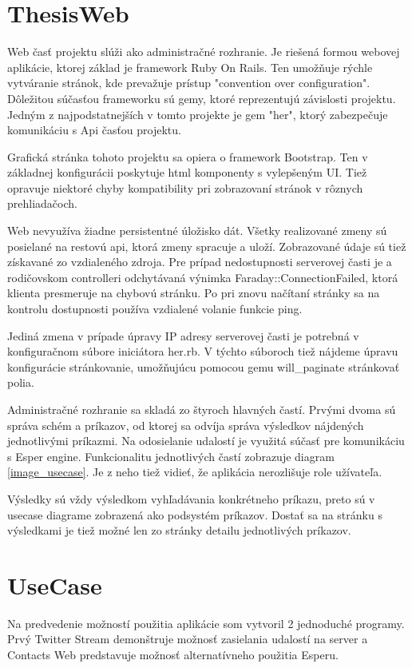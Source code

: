\section{ThesisWeb}
	Web časť projektu slúži ako administračné rozhranie. Je riešená formou webovej aplikácie, ktorej základ je framework Ruby On Rails. Ten umožňuje rýchle vytváranie stránok, kde prevažuje prístup "convention over configuration". Dôležitou súčasťou frameworku sú gemy, ktoré reprezentujú závislosti projektu. Jedným z najpodstatnejších v tomto projekte je gem "her", ktorý zabezpečuje komunikáciu s Api časťou projektu.
	
	
	Grafická stránka tohoto projektu sa opiera o framework Bootstrap. Ten v základnej konfigurácii poskytuje html komponenty s vylepšeným UI. Tiež opravuje niektoré chyby kompatibility pri zobrazovaní stránok v rôznych prehliadačoch.
	
	Web nevyužíva žiadne persistentné úložisko dát. Všetky realizované zmeny sú posielané na restovú api, ktorá zmeny spracuje a uloží. Zobrazované údaje sú tiež získavané zo vzdialeného zdroja.
	Pre prípad nedostupnosti serverovej časti je a rodičovskom controlleri odchytávaná výnimka Faraday::ConnectionFailed, ktorá klienta presmeruje na chybovú stránku. Po pri znovu načítaní stránky sa na kontrolu dostupnosti používa vzdialené volanie funkcie ping.
	
	Jediná zmena v prípade úpravy IP adresy serverovej časti je potrebná v konfiguračnom súbore iniciátora her.rb. V týchto súboroch tiež nájdeme úpravu konfigurácie stránkovanie, umožňujúcu pomocou gemu will\_paginate stránkovať polia.

	Administračné rozhranie sa skladá zo štyroch hlavných častí. Prvými dvoma sú správa schém a príkazov, od ktorej sa odvíja správa výsledkov nájdených jednotlivými príkazmi. Na odosielanie udalostí je využitá súčasť pre komunikáciu s Esper engine. Funkcionalitu jednotlivých častí zobrazuje diagram \ref{image_usecase}. Je z neho tiež vidieť, že aplikácia nerozlišuje role užívateľa.	
	
	Výsledky sú vždy výsledkom vyhľadávania konkrétneho príkazu, preto sú v usecase diagrame zobrazená ako podsystém príkazov. Dostať sa na stránku s výsledkami je tiež možné len zo stránky detailu jednotlivých príkazov.

\section{UseCase}
	Na predvedenie možností použitia aplikácie som vytvoril 2 jednoduché programy. Prvý Twitter Stream demonštruje možnosť zasielania udalostí na server a Contacts Web predstavuje možnosť alternatívneho použitia Esperu. 
	
